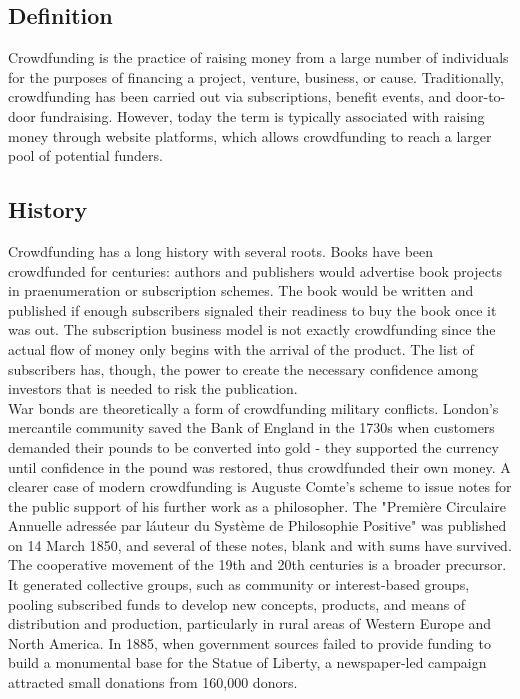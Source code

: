 \subsection*{Definition}
Crowdfunding is the practice of raising money from a large number of individuals for the purposes of financing a project, venture, business, or cause. Traditionally, crowdfunding has been carried out via subscriptions, benefit events, and door-to-door fundraising. However, today the term is typically associated with raising money through website platforms, which allows crowdfunding to reach a larger pool of potential funders.
\subsection*{History}
Crowdfunding has a long history with several roots. Books have been crowdfunded for centuries: authors and publishers would advertise book projects in praenumeration or subscription schemes. The book would be written and published if enough subscribers signaled their readiness to buy the book once it was out. The subscription business model is not exactly crowdfunding since the actual flow of money only begins with the arrival of the product. The list of subscribers has, though, the power to create the necessary confidence among investors that is needed to risk the publication.\\
War bonds are theoretically a form of crowdfunding military conflicts. London's mercantile community saved the Bank of England in the 1730s when customers demanded their pounds to be converted into gold - they supported the currency until confidence in the pound was restored, thus crowdfunded their own money. A clearer case of modern crowdfunding is Auguste Comte's scheme to issue notes for the public support of his further work as a philosopher. The "Première Circulaire Annuelle adressée par l\'auteur du Système de Philosophie Positive" was published on 14 March 1850, and several of these notes, blank and with sums have survived.\\
The cooperative movement of the 19th and 20th centuries is a broader precursor. It generated collective groups, such as community or interest-based groups, pooling subscribed funds to develop new concepts, products, and means of distribution and production, particularly in rural areas of Western Europe and North America. In 1885, when government sources failed to provide funding to build a monumental base for the Statue of Liberty, a newspaper-led campaign attracted small donations from 160,000 donors.\\
